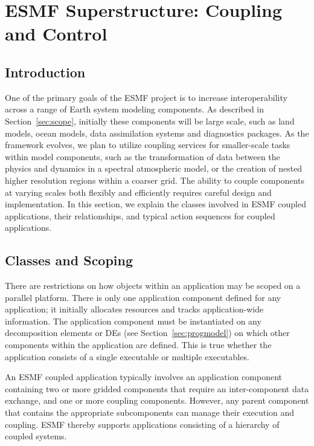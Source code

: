 \section{ESMF Superstructure:  Coupling and Control}
\label{sec:superclasses}

\subsection{Introduction}

One of the primary goals of the ESMF project is to increase interoperability
across a range of Earth system modeling components.  As described in 
Section~\ref{sec:scope}, initially these 
components will be large scale, such as land models, ocean models, 
data assimilation systems and diagnostics packages.  As the 
framework evolves, we plan to utilize coupling services for smaller-scale 
tasks within model components, such as the transformation of data between the 
physics and dynamics in a spectral atmospheric model, or the creation 
of nested higher resolution regions within a coarser grid.  The ability to 
couple components at varying scales both flexibly and efficiently requires
careful design and implementation.  In this section, we 
explain the classes involved in ESMF coupled applications, their 
relationships, and typical action sequences for coupled applications.  

\subsection{Classes and Scoping}

There are restrictions on how objects within an application may be scoped
on a parallel platform.  There is only one application component defined 
for any application; it initially allocates resources and tracks 
application-wide information. 
The application component must be instantiated on 
any decomposition elements or DEs (see Section~\ref{sec:progmodel}) on 
which other components
within the application are defined.  This is true whether the 
application consists of a single executable or multiple 
executables.  

An ESMF coupled application typically involves an application component 
containing two or more gridded components that require an 
inter-component data exchange, and one or more coupling 
components.  However, any parent component that contains the appropriate 
subcomponents can manage their execution and coupling.  ESMF thereby
supports applications consisting of a hierarchy of coupled systems.

